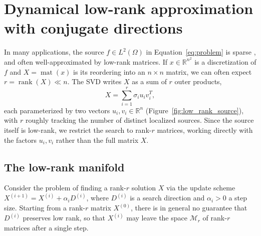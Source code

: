 \section{Dynamical low-rank approximation with conjugate directions}
\label{sec:dlracg}


In many applications, the source $f \in L^2(\Omega)$ in Equation~\eqref{eq:problem} is sparse \cite{elvetunWeightedSparsityRegularization2023}, and often well-approximated by low-rank matrices. If $x \in \mathbb{R}^{n^2}$ is a discretization of $f$ and $X = \operatorname{mat}(x)$ is its reordering into an $n \times n$ matrix, we can often expect $r = \operatorname{rank}(X) \ll n$. The SVD writes $X$ as a sum of $r$ outer products,
\begin{equation*}
    X = \sum_{i=1}^{r} \sigma_i u_i v_i^T,
\end{equation*}
each parameterized by two vectors $u_i, v_i \in \mathbb{R}^n$ (Figure~\ref{fig:low_rank_source}), with $r$ roughly tracking the number of distinct localized sources. Since the source itself is low-rank, we restrict the search to rank-$r$ matrices, working directly with the factors $u_i, v_i$ rather than the full 
matrix $X$.


\subsection{The low-rank manifold}

Consider the problem of finding a rank-$r$ solution $X$ via the update scheme $X^{(i+1)} = X^{(i)} + \alpha_i D^{(i)}$, where $D^{(i)}$ is a search direction and $\alpha_i > 0$ a step size. Starting from a rank-$r$ matrix $X^{(0)}$, there is in general no guarantee that $D^{(i)}$ preserves low rank, so that $X^{(i)}$ may leave the space $\mathcal{M}_r$ of rank-$r$ matrices after a single step.

